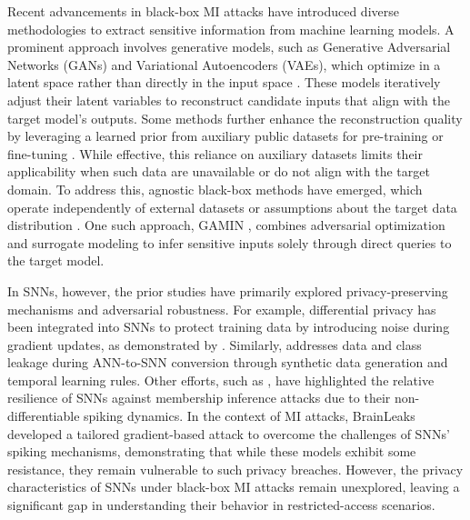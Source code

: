 Recent advancements in black-box MI attacks have introduced diverse methodologies to extract sensitive information from machine learning models. A prominent approach involves generative models, such as Generative Adversarial Networks (GANs) and Variational Autoencoders (VAEs), which optimize in a latent space rather than directly in the input space \cite{nguyen2024label,han2023reinforcement, kahla2022label}. These models iteratively adjust their latent variables to reconstruct candidate inputs that align with the target model’s outputs. Some methods further enhance the reconstruction quality by leveraging a learned prior from auxiliary public datasets for pre-training or fine-tuning \cite{khosravy2022model, xu2023sparse,ye2023c2fmi}. While effective, this reliance on auxiliary datasets limits their applicability when such data are unavailable or do not align with the target domain. To address this, agnostic black-box methods have emerged, which operate independently of external datasets or assumptions about the target data distribution \cite{tramer2016stealing}. One such approach, GAMIN \cite{aivodji2019gamin}, combines adversarial optimization and surrogate modeling to infer sensitive inputs solely through direct queries to the target model.


In SNNs, however, the prior studies have primarily explored privacy-preserving mechanisms and adversarial robustness. For example, differential privacy has been integrated into SNNs to protect training data by introducing noise during gradient updates, as demonstrated by \cite{wang2022dpsnn}. Similarly, \cite{kim2022privatesnn} addresses data and class leakage during ANN-to-SNN conversion through synthetic data generation and temporal learning rules. Other efforts, such as \cite{moshruba2024neuromorphic}, have highlighted the relative resilience of SNNs against membership inference attacks due to their non-differentiable spiking dynamics. In the context of MI attacks, BrainLeaks \cite{poursiami2024brainleaks} developed a tailored gradient-based attack to overcome the challenges of SNNs' spiking mechanisms, demonstrating that while these models exhibit some resistance, they remain vulnerable to such privacy breaches. However, the privacy characteristics of SNNs under black-box MI attacks remain unexplored, leaving a significant gap in understanding their behavior in restricted-access scenarios.

